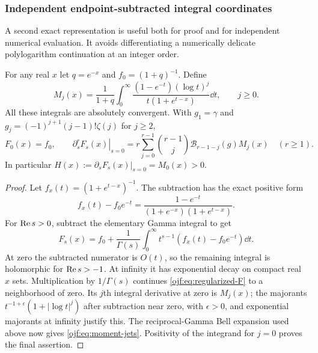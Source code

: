 \subsubsection{Independent endpoint-subtracted integral coordinates}
A second exact representation is useful both for proof and for independent
numerical evaluation. It avoids differentiating a numerically delicate
polylogarithm continuation at an integer order.

\begin{theorem}
\label{ojf:thm:regularization}
For any real $x$ let $q=e^{-x}$ and $f_0=(1+q)^{-1}$. Define
\begin{equation}\label{ojf:eq:moments}
 M_j(x)=\frac1{1+q}\int_0^\infty
       \frac{(1-e^{-t})(\log t)^j}{t(1+e^{t-x})}\dd t,
       \qquad j\ge0.
\end{equation}
All these integrals are absolutely convergent. With
$g_1=\gamma$ and $g_j=(-1)^{j+1}(j-1)!\zeta(j)$ for $j\ge2$,
\begin{equation}\label{ojf:eq:moment-jets}
 F_0(x)=f_0,\qquad
 \left.\partial_s^rF_s(x)\right|_{s=0}
   =r\sum_{j=0}^{r-1}\binom{r-1}{j}\mathcal{B}_{r-1-j}(g)M_j(x)
       \quad(r\ge1).
\end{equation}
In particular $H(x):=\partial_sF_s(x)|_{s=0}=M_0(x)>0$.
\end{theorem}

\begin{proof}
Let $f_x(t)=(1+e^{t-x})^{-1}$. The subtraction has the exact
positive form
\begin{equation}\label{ojf:eq:positive-subtraction}
 f_x(t)-f_0e^{-t}
  =\frac{1-e^{-t}}{(1+e^{-x})(1+e^{t-x})}.
\end{equation}
For $\operatorname{Re} s>0$, subtract the elementary Gamma integral to get
\begin{equation}\label{ojf:eq:regularized-F}
 F_s(x)=f_0+\frac1{\Gamma(s)}\int_0^\infty
                          t^{s-1}(f_x(t)-f_0e^{-t})\dd t.
\end{equation}
At zero the subtracted numerator is $O(t)$, so the remaining integral
is holomorphic for $\operatorname{Re} s>-1$. At infinity it has exponential decay
on compact real $x$ sets. Multiplication by $1/\Gamma(s)$ continues
\eqref{ojf:eq:regularized-F} to a neighborhood of zero.
Its $j$th integral derivative at zero is $M_j(x)$; the majorants
$t^{-1+\epsilon}(1+|\log t|^j)$ after subtraction near zero, with
$\epsilon>0$, and exponential majorants at infinity justify this.
The reciprocal-Gamma Bell expansion used above now gives
\eqref{ojf:eq:moment-jets}. Positivity of the integrand for $j=0$ proves
the final assertion.
\end{proof}

